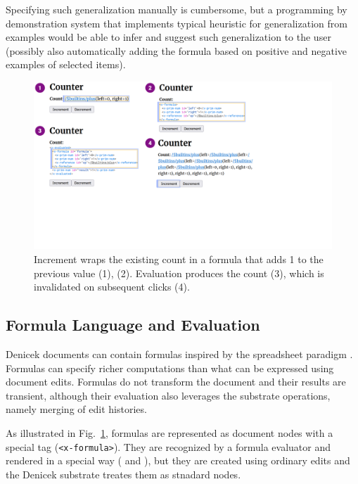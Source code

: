\documentclass[sigconf]{acmart}
\newcommand*\circled[1]{\textnormal{\footnotesize\sffamily\bfseries\protect\tikz[baseline=(char.base)]{
  \node[shape=circle,fill=black,text=white,draw,inner sep=1pt] (char) {#1};}}}
\begin{document}
Specifying such generalization manually is cumbersome, but a programming by demonstration system
that implements typical heuristic for generalization from examples \cite{myers-2000-intelligence}
would be able to infer and suggest such generalization to the user (possibly also automatically
adding the formula based on positive and negative examples of selected items).

\begin{figure}[t]
\includegraphics[width=0.95\columnwidth,clip,trim=0cm 7cm 8cm 0cm]{fig/counter.pdf}
\caption{Increment wraps the existing count in a formula that adds 1 to the
previous value (1), (2). Evaluation produces the count (3), which is invalidated on subsequent clicks (4).}
\label{fig:counter}
\vspace{-0.5em}
\end{figure}

\subsection{Formula Language and Evaluation}
\label{sec:impl-eval}

Denicek documents can contain formulas inspired by the spreadsheet
paradigm \cite{nardi-1990-spreadsheets}. Formulas can specify richer computations than
what can be expressed using document edits. Formulas do not transform the document and their
results are transient, although their evaluation also leverages the substrate operations,
namely merging of edit histories.

As illustrated in Fig.~\ref{fig:counter}, formulas are represented as document nodes with a
special tag ({\small\Verb_<x-formula>_}). They are recognized by a formula evaluator and
rendered in a special way (\circled{1} and \circled{4}), but they are created using ordinary
edits and the Denicek substrate treates them as stnadard nodes.
\end{document}

